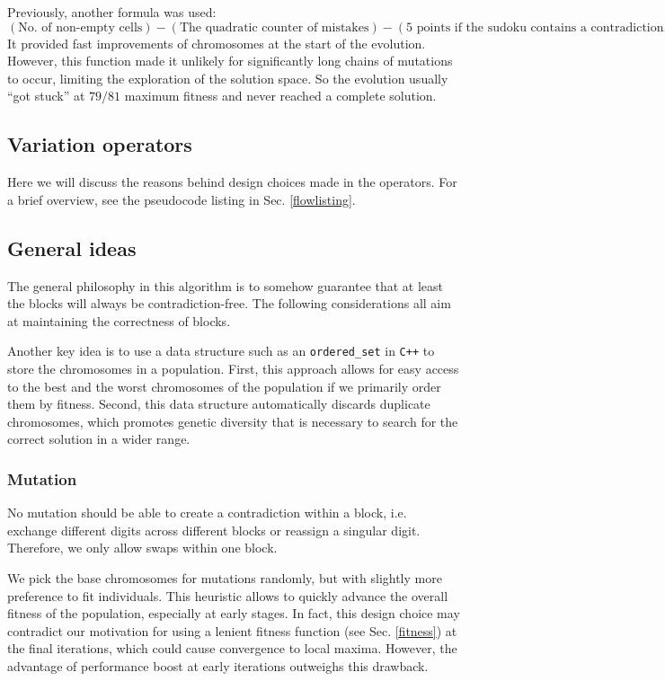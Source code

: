\documentclass[10pt]{article}
\begin{document}
Previously, another formula was used:
\[(\textrm{No. of non-empty cells}) - (\textrm{The quadratic counter of mistakes})
    - (\textrm{5 points if the sudoku contains a contradiction, else 0}).\]
It provided fast improvements of chromosomes at the start of the evolution.
However, this function made it unlikely for significantly long chains of mutations to
occur, limiting the exploration of the solution space. So the evolution usually
``got stuck'' at $79/81$ maximum fitness and never reached a complete solution.

\subsection{Variation operators}
Here we will discuss the reasons behind design choices made in the operators.
For a brief overview, see the pseudocode listing in Sec. \ref{flowlisting}.

\subsection{General ideas}
The general philosophy in this algorithm is to somehow guarantee that at least
the blocks will always be contradiction-free. The following considerations all
aim at maintaining the correctness of blocks.

Another key idea is to use a data structure such as an \texttt{ordered\_set} in \texttt{C++}
to store the chromosomes in a population. First, this approach allows for easy
access to the best and the worst chromosomes of the population if we primarily
order them by fitness. Second, this data structure automatically discards duplicate
chromosomes, which promotes genetic diversity that is necessary to search for
the correct solution in a wider range.

\subsubsection{Mutation}
No mutation should be able to create a contradiction within a block, i.e.
exchange different digits across different blocks or reassign a singular digit.
Therefore, we only allow swaps within one block.

We pick the base chromosomes for mutations randomly, but with slightly more preference
to fit individuals. This heuristic allows to quickly advance the overall fitness
of the population, especially at early stages. In fact, this design choice may
contradict our motivation for using a lenient fitness function (see Sec. \ref{fitness})
at the final iterations, which could cause convergence to local maxima. However,
the advantage of performance boost at early iterations outweighs this drawback.
\end{document}
